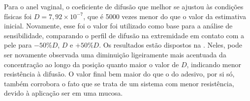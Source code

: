 Para o anel vaginal, o coeficiente de difusão que melhor se ajustou às condições físicas foi $D = 7,92 \times 10^{-7}$, que é 5000 vezes menor do que o valor da estimativa inicial. Novamente, esse foi o valor foi utilizado como base para a análise de sensibilidade, comparando o perfil de difusão na extremidade em contato com a pele para $-50\% D$, $D$ e $+50\%D$. Os resultados estão dispostos na . Neles, pode ser novamente observada uma diminuição ligeiramente mais acentuada da concentração ao longo da posição quanto maior o valor de $D$, indicando menor resistência à difusão. O valor final bem maior do que o do adesivo, por si só, também corrobora o fato que se trata de um sistema com menor resistência, devido à aplicação ser em uma mucosa.

\begin{figure}[!htb]
    \centering
    \\
    \\
\end{figure}
